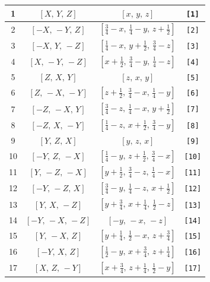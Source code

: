 \documentclass[fleqn,8pt]{jsarticle}
\begin{document}
\begin{longtable}{cccc}
1 & $\left[ X,\, Y,\, Z \right]$ & $\left[ x,\, y,\, z \right]$ & {\tt [1]} \\ \hline
2 & $\left[ - X,\, - Y,\, Z \right]$ & $\left[ \frac{3}{4} - x,\, \frac{1}{4} - y,\, z + \frac{1}{2} \right]$ & {\tt [2]} \\ \hline
3 & $\left[ - X,\, Y,\, - Z \right]$ & $\left[ \frac{1}{4} - x,\, y + \frac{1}{2},\, \frac{3}{4} - z \right]$ & {\tt [3]} \\ \hline
4 & $\left[ X,\, - Y,\, - Z \right]$ & $\left[ x + \frac{1}{2},\, \frac{3}{4} - y,\, \frac{1}{4} - z \right]$ & {\tt [4]} \\ \hline
5 & $\left[ Z,\, X,\, Y \right]$ & $\left[ z,\, x,\, y \right]$ & {\tt [5]} \\ \hline
6 & $\left[ Z,\, - X,\, - Y \right]$ & $\left[ z + \frac{1}{2},\, \frac{3}{4} - x,\, \frac{1}{4} - y \right]$ & {\tt [6]} \\ \hline
7 & $\left[ - Z,\, - X,\, Y \right]$ & $\left[ \frac{3}{4} - z,\, \frac{1}{4} - x,\, y + \frac{1}{2} \right]$ & {\tt [7]} \\ \hline
8 & $\left[ - Z,\, X,\, - Y \right]$ & $\left[ \frac{1}{4} - z,\, x + \frac{1}{2},\, \frac{3}{4} - y \right]$ & {\tt [8]} \\ \hline
9 & $\left[ Y,\, Z,\, X \right]$ & $\left[ y,\, z,\, x \right]$ & {\tt [9]} \\ \hline
10 & $\left[ - Y,\, Z,\, - X \right]$ & $\left[ \frac{1}{4} - y,\, z + \frac{1}{2},\, \frac{3}{4} - x \right]$ & {\tt [10]} \\ \hline
11 & $\left[ Y,\, - Z,\, - X \right]$ & $\left[ y + \frac{1}{2},\, \frac{3}{4} - z,\, \frac{1}{4} - x \right]$ & {\tt [11]} \\ \hline
12 & $\left[ - Y,\, - Z,\, X \right]$ & $\left[ \frac{3}{4} - y,\, \frac{1}{4} - z,\, x + \frac{1}{2} \right]$ & {\tt [12]} \\ \hline
13 & $\left[ Y,\, X,\, - Z \right]$ & $\left[ y + \frac{3}{4},\, x + \frac{1}{4},\, \frac{1}{2} - z \right]$ & {\tt [13]} \\ \hline
14 & $\left[ - Y,\, - X,\, - Z \right]$ & $\left[ - y,\, - x,\, - z \right]$ & {\tt [14]} \\ \hline
15 & $\left[ Y,\, - X,\, Z \right]$ & $\left[ y + \frac{1}{4},\, \frac{1}{2} - x,\, z + \frac{3}{4} \right]$ & {\tt [15]} \\ \hline
16 & $\left[ - Y,\, X,\, Z \right]$ & $\left[ \frac{1}{2} - y,\, x + \frac{3}{4},\, z + \frac{1}{4} \right]$ & {\tt [16]} \\ \hline
17 & $\left[ X,\, Z,\, - Y \right]$ & $\left[ x + \frac{3}{4},\, z + \frac{1}{4},\, \frac{1}{2} - y \right]$ & {\tt [17]} \\ \hline

\end{longtable}
\end{document}
